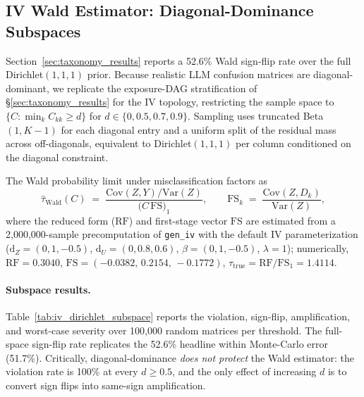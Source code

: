 
\subsection{IV Wald Estimator: Diagonal-Dominance Subspaces}
\label{sec:iv_dirichlet_subspace}

Section~\ref{sec:taxonomy_results} reports a 52.6\% Wald sign-flip rate
over the full Dirichlet$(1,1,1)$ prior. Because realistic LLM confusion
matrices are diagonal-dominant, we replicate the exposure-DAG stratification
of \S\ref{sec:taxonomy_results} for the IV topology, restricting the sample
space to $\{C : \min_k C_{kk} \geq d\}$ for $d \in \{0, 0.5, 0.7, 0.9\}$.
Sampling uses truncated Beta$(1,K{-}1)$ for each diagonal entry and a
uniform split of the residual mass across off-diagonals, equivalent to
Dirichlet$(1,1,1)$ per column conditioned on the diagonal constraint.

The Wald probability limit under misclassification factors as
\[
\hat\tau_{\text{Wald}}(C)
   \;=\; \frac{\mathrm{Cov}(Z,Y)/\mathrm{Var}(Z)}
              {\bigl(C\,\mathrm{FS}\bigr)_{1}},
\qquad
\mathrm{FS}_k \;=\; \frac{\mathrm{Cov}(Z, D_k)}{\mathrm{Var}(Z)},
\]
where the reduced form ($\mathrm{RF}$) and first-stage vector
$\mathrm{FS}$ are estimated from a 2{,}000{,}000-sample precomputation of
\texttt{gen\_iv} with the default IV parameterization
($\mathrm{d}_Z{=}(0,1,{-}0.5)$, $\mathrm{d}_U{=}(0,0.8,0.6)$,
$\beta{=}(0,1,{-}0.5)$, $\lambda{=}1$); numerically,
$\mathrm{RF}{=}0.3040$, $\mathrm{FS}{=}({-}0.0382,\,0.2154,\,{-}0.1772)$,
$\tau_{\text{true}}{=}\mathrm{RF}/\mathrm{FS}_1{=}1.4114$.

\paragraph{Subspace results.}
Table~\ref{tab:iv_dirichlet_subspace} reports the violation, sign-flip,
amplification, and worst-case severity over 100{,}000 random matrices per
threshold. The full-space sign-flip rate replicates the 52.6\% headline
within Monte-Carlo error (51.7\%). Critically, diagonal-dominance \emph{does
not protect} the Wald estimator: the violation rate is 100\% at every
$d \geq 0.5$, and the only effect of increasing $d$ is to convert sign
flips into same-sign amplification.

